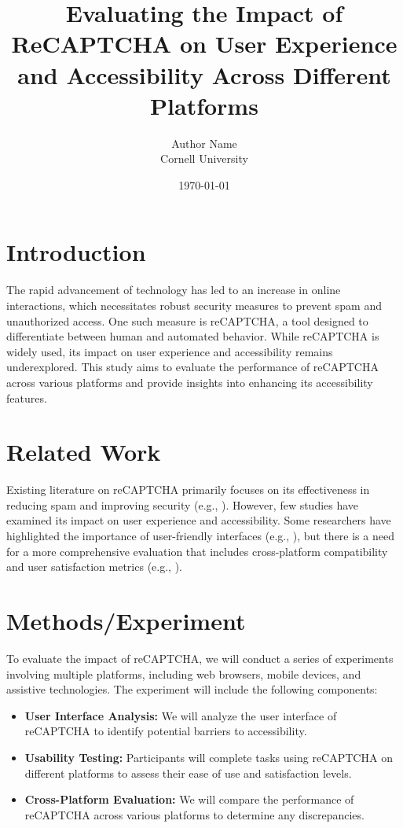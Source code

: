 \documentclass{article}
\title{Evaluating the Impact of ReCAPTCHA on User Experience and Accessibility Across Different Platforms}
\author{Author Name \\ Cornell University}
\date{\today}
\begin{document}
\maketitle

\section{Introduction}
The rapid advancement of technology has led to an increase in online interactions, which necessitates robust security measures to prevent spam and unauthorized access. One such measure is reCAPTCHA, a tool designed to differentiate between human and automated behavior. While reCAPTCHA is widely used, its impact on user experience and accessibility remains underexplored. This study aims to evaluate the performance of reCAPTCHA across various platforms and provide insights into enhancing its accessibility features.

\section{Related Work}
Existing literature on reCAPTCHA primarily focuses on its effectiveness in reducing spam and improving security (e.g., \cite{ref1}). However, few studies have examined its impact on user experience and accessibility. Some researchers have highlighted the importance of user-friendly interfaces (e.g., \cite{ref2}), but there is a need for a more comprehensive evaluation that includes cross-platform compatibility and user satisfaction metrics (e.g., \cite{ref3}).

\section{Methods/Experiment}
To evaluate the impact of reCAPTCHA, we will conduct a series of experiments involving multiple platforms, including web browsers, mobile devices, and assistive technologies. The experiment will include the following components:
\begin{itemize}
    \item \textbf{User Interface Analysis:} We will analyze the user interface of reCAPTCHA to identify potential barriers to accessibility.
    \item \textbf{Usability Testing:} Participants will complete tasks using reCAPTCHA on different platforms to assess their ease of use and satisfaction levels.
    \item \textbf{Cross-Platform Evaluation:} We will compare the performance of reCAPTCHA across various platforms to determine any discrepancies.
\end{itemize}
\end{document}
